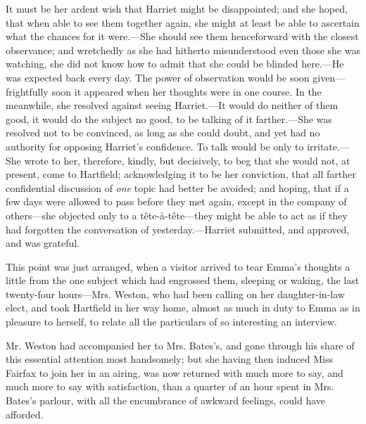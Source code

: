 It must be her ardent wish that Harriet might be disappointed; and she hoped, that when able to see them together again, she might at least be able to ascertain what the chances for it were.---She should see them henceforward with the closest observance; and wretchedly as she had hitherto misunderstood even those she was watching, she did not know how to admit that she could be blinded here.---He was expected back every day. The power of observation would be soon given---frightfully soon it appeared when her thoughts were in one course. In the meanwhile, she resolved against seeing Harriet.---It would do neither of them good, it would do the subject no good, to be talking of it farther.---She was resolved not to be convinced, as long as she could doubt, and yet had no authority for opposing Harriet's confidence. To talk would be only to irritate.---She wrote to her, therefore, kindly, but decisively, to beg that she would not, at present, come to Hartfield; acknowledging it to be her conviction, that all farther confidential discussion of {\em one} topic had better be avoided; and hoping, that if a few days were allowed to pass before they met again, except in the company of others---she objected only to a tête-à-tête---they might be able to act as if they had forgotten the conversation of yesterday.---Harriet submitted, and approved, and was grateful.

This point was just arranged, when a visitor arrived to tear Emma's thoughts a little from the one subject which had engrossed them, sleeping or waking, the last twenty-four hours---Mrs. Weston, who had been calling on her daughter-in-law elect, and took Hartfield in her way home, almost as much in duty to Emma as in pleasure to herself, to relate all the particulars of so interesting an interview.

Mr. Weston had accompanied her to Mrs. Bates's, and gone through his share of this essential attention most handsomely; but she having then induced Miss Fairfax to join her in an airing, was now returned with much more to say, and much more to say with satisfaction, than a quarter of an hour spent in Mrs. Bates's parlour, with all the encumbrance of awkward feelings, could have afforded.

